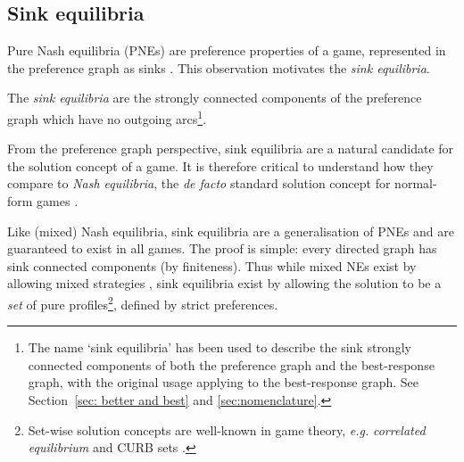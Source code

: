 \documentclass[preprint,authoryear]{elsarticle}
\begin{document}

\subsection{Sink equilibria}

Pure Nash equilibria (PNEs) are preference properties of a game, represented in the preference graph as sinks \citep{biggar_graph_2023}. This observation motivates the \emph{sink equilibria}.

\begin{defn}
    The \emph{sink equilibria} are the strongly connected components of the preference graph which have no outgoing arcs\footnote{The name `sink equilibria' has been used to describe the sink strongly connected components of both the preference graph and the best-response graph, with the original usage \citep{goemans_sink_2005} applying to the best-response graph. See Section~\ref{sec: better and best} and \ref{sec:nomenclature}.}.
\end{defn}

From the preference graph perspective, sink equilibria are a natural candidate for the solution concept of a game. It is therefore critical to understand how they compare to \emph{Nash equilibria}, the \emph{de facto} standard solution concept for normal-form games \citep{myerson1997game}.

Like (mixed) Nash equilibria, sink equilibria are a generalisation of PNEs and are guaranteed to exist in all games. The proof is simple: every directed graph has sink connected components (by finiteness). Thus while mixed NEs exist by allowing mixed strategies \citep{myerson1997game}, sink equilibria exist by allowing the solution to be a \emph{set} of pure profiles\footnote{Set-wise solution concepts are well-known in game theory, \emph{e.g.} \emph{correlated equilibrium} \citep{aumann1987correlated} and CURB sets \citep{basu_strategy_1991}.}, defined by strict preferences.
\end{document}
